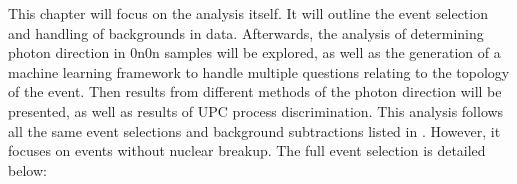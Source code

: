 This chapter will focus on the analysis itself. It will outline the event selection and handling of backgrounds in data. Afterwards, the analysis of determining photon direction in 0n0n samples will be explored, as well as the generation of a machine learning framework to handle multiple questions relating to the topology of the event. Then results from different methods of the photon direction will be presented, as well as results of UPC process discrimination. This analysis follows all the same event selections and background subtractions listed in \cite{collaboration_measurement_2025}. However, it focuses on events without nuclear breakup. The full event selection is detailed below:
